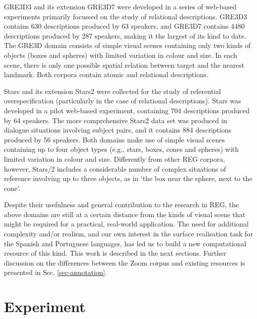 \documentclass{article}
\begin{document}
GRE3D3 and its extension GRE3D7 \cite{gre3d3,gre3d7} were developed in a series of web-based experiments primarily focussed on the study of relational descriptions. GRE3D3 contains 630 descriptions produced by 63 speakers, and GRE3D7 contains 4480 descriptions produced by 287 speakers, making it the largest of its kind to date. The GRE3D domain consists of simple visual scenes containing only two kinds of objects (boxes and spheres) with limited variation in colour and size. In each scene, there is only one possible spatial relation between target and the nearest landmark. Both corpora contain atomic and relational descriptions.

Stars \cite{stars-mutual-disamb} and its extension Stars2 were collected for the study of referential overspecification (particularly in the case of relational descriptions). Stars was developed in a pilot web-based experiment, containing 704 descriptions produced by 64 speakers.  The more comprehensive Stars2 data set was produced in dialogue situations involving subject pairs, and it contains 884 descriptions produced by 56 speakers. Both domains make use of simple visual scenes containing up to four object types (e.g., stars, boxes, cones and spheres) with limited variation in colour and size. Differently from other REG corpora, however, Stars/2 includes a considerable number of complex situations of reference involving up to three objects, as in `the box near the sphere, next to the cone'. 

Despite their usefulness and general contribution to the research in REG, the above domains are still at a certain distance from the kinds of visual scene that might be required for a practical, real-world application. The need for additional complexity and/or realism, and our own interest in the surface realisation task for the Spanish and Portuguese languages, has led us to build a new computational resource of this kind. This work is described in the next sections. Further discussion on the differences between the Zoom corpus and existing resources is presented in Sec. \ref{sec-annotation}. 


\section{Experiment}
\label{sec-experiment}
\end{document}

